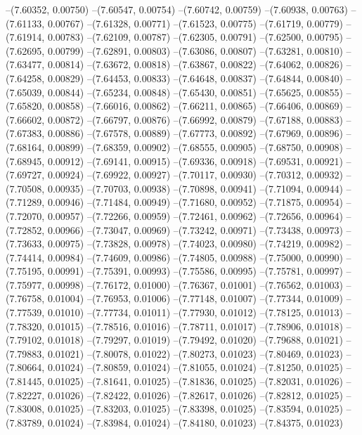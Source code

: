 --(7.60352, 0.00750)
--(7.60547, 0.00754)
--(7.60742, 0.00759)
--(7.60938, 0.00763)
--(7.61133, 0.00767)
--(7.61328, 0.00771)
--(7.61523, 0.00775)
--(7.61719, 0.00779)
--(7.61914, 0.00783)
--(7.62109, 0.00787)
--(7.62305, 0.00791)
--(7.62500, 0.00795)
--(7.62695, 0.00799)
--(7.62891, 0.00803)
--(7.63086, 0.00807)
--(7.63281, 0.00810)
--(7.63477, 0.00814)
--(7.63672, 0.00818)
--(7.63867, 0.00822)
--(7.64062, 0.00826)
--(7.64258, 0.00829)
--(7.64453, 0.00833)
--(7.64648, 0.00837)
--(7.64844, 0.00840)
--(7.65039, 0.00844)
--(7.65234, 0.00848)
--(7.65430, 0.00851)
--(7.65625, 0.00855)
--(7.65820, 0.00858)
--(7.66016, 0.00862)
--(7.66211, 0.00865)
--(7.66406, 0.00869)
--(7.66602, 0.00872)
--(7.66797, 0.00876)
--(7.66992, 0.00879)
--(7.67188, 0.00883)
--(7.67383, 0.00886)
--(7.67578, 0.00889)
--(7.67773, 0.00892)
--(7.67969, 0.00896)
--(7.68164, 0.00899)
--(7.68359, 0.00902)
--(7.68555, 0.00905)
--(7.68750, 0.00908)
--(7.68945, 0.00912)
--(7.69141, 0.00915)
--(7.69336, 0.00918)
--(7.69531, 0.00921)
--(7.69727, 0.00924)
--(7.69922, 0.00927)
--(7.70117, 0.00930)
--(7.70312, 0.00932)
--(7.70508, 0.00935)
--(7.70703, 0.00938)
--(7.70898, 0.00941)
--(7.71094, 0.00944)
--(7.71289, 0.00946)
--(7.71484, 0.00949)
--(7.71680, 0.00952)
--(7.71875, 0.00954)
--(7.72070, 0.00957)
--(7.72266, 0.00959)
--(7.72461, 0.00962)
--(7.72656, 0.00964)
--(7.72852, 0.00966)
--(7.73047, 0.00969)
--(7.73242, 0.00971)
--(7.73438, 0.00973)
--(7.73633, 0.00975)
--(7.73828, 0.00978)
--(7.74023, 0.00980)
--(7.74219, 0.00982)
--(7.74414, 0.00984)
--(7.74609, 0.00986)
--(7.74805, 0.00988)
--(7.75000, 0.00990)
--(7.75195, 0.00991)
--(7.75391, 0.00993)
--(7.75586, 0.00995)
--(7.75781, 0.00997)
--(7.75977, 0.00998)
--(7.76172, 0.01000)
--(7.76367, 0.01001)
--(7.76562, 0.01003)
--(7.76758, 0.01004)
--(7.76953, 0.01006)
--(7.77148, 0.01007)
--(7.77344, 0.01009)
--(7.77539, 0.01010)
--(7.77734, 0.01011)
--(7.77930, 0.01012)
--(7.78125, 0.01013)
--(7.78320, 0.01015)
--(7.78516, 0.01016)
--(7.78711, 0.01017)
--(7.78906, 0.01018)
--(7.79102, 0.01018)
--(7.79297, 0.01019)
--(7.79492, 0.01020)
--(7.79688, 0.01021)
--(7.79883, 0.01021)
--(7.80078, 0.01022)
--(7.80273, 0.01023)
--(7.80469, 0.01023)
--(7.80664, 0.01024)
--(7.80859, 0.01024)
--(7.81055, 0.01024)
--(7.81250, 0.01025)
--(7.81445, 0.01025)
--(7.81641, 0.01025)
--(7.81836, 0.01025)
--(7.82031, 0.01026)
--(7.82227, 0.01026)
--(7.82422, 0.01026)
--(7.82617, 0.01026)
--(7.82812, 0.01025)
--(7.83008, 0.01025)
--(7.83203, 0.01025)
--(7.83398, 0.01025)
--(7.83594, 0.01025)
--(7.83789, 0.01024)
--(7.83984, 0.01024)
--(7.84180, 0.01023)
--(7.84375, 0.01023)
